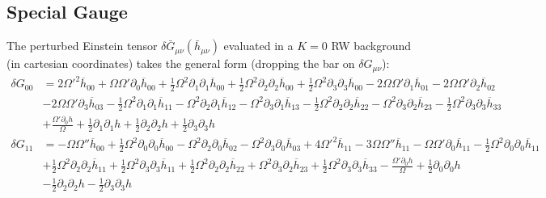 \documentclass[10pt,letterpaper]{article}
\numberwithin{equation}{section}
\begin{document}
\subsection{Special Gauge}
The perturbed Einstein tensor $\delta \bar G_{\mu\nu}(\bar h_{\mu\nu})$ evaluated in a $K=0$ RW background (in cartesian coordinates) takes the general form (dropping the bar on $\delta G_{\mu\nu}$):
\begin{align}
	\delta  G_{00} &=2 \Omega '^2 \overline{h}_{00} + \Omega \Omega ' \partial_{0} \overline{h}_{00} + \tfrac{1}{2} \Omega^2 \partial_{1} \partial_{1} \overline{h}_{00} + \tfrac{1}{2} \Omega^2 \partial_{2} \partial_{2} \overline{h}_{00} + \tfrac{1}{2} \Omega^2 \partial_{3} \partial_{3} \overline{h}_{00} - 2 \Omega \Omega ' \partial_{1} \overline{h}_{01} - 2 \Omega \Omega ' \partial_{2} \overline{h}_{02} \\
& - 2 \Omega \Omega ' \partial_{3} \overline{h}_{03} -  \tfrac{1}{2} \Omega^2 \partial_{1} \partial_{1} \overline{h}_{11} -  \Omega^2 \partial_{2} \partial_{1} \overline{h}_{12} -  \Omega^2 \partial_{3} \partial_{1} \overline{h}_{13} -  \tfrac{1}{2} \Omega^2 \partial_{2} \partial_{2} \overline{h}_{22} -  \Omega^2 \partial_{3} \partial_{2} \overline{h}_{23} -  \tfrac{1}{2} \Omega^2 \partial_{3} \partial_{3} \overline{h}_{33}\nonumber \\
&+ \frac{\Omega ' \partial_{0} h}{\Omega} + \tfrac{1}{2} \partial_{1} \partial_{1} h + \tfrac{1}{2} \partial_{2} \partial_{2} h + \tfrac{1}{2} \partial_{3} \partial_{3} h\nonumber
\end{align}
\begin{align}
	\delta  G_{11} &=- \Omega \Omega '' \overline{h}_{00} + \tfrac{1}{2} \Omega^2 \partial_{0} \partial_{0} \overline{h}_{00} -  \Omega^2 \partial_{2} \partial_{0} \overline{h}_{02} -  \Omega^2 \partial_{3} \partial_{0} \overline{h}_{03} + 4 \Omega '^2 \overline{h}_{11} - 3 \Omega \Omega '' \overline{h}_{11} -  \Omega \Omega ' \partial_{0} \overline{h}_{11} -  \tfrac{1}{2} \Omega^2 \partial_{0} \partial_{0} \overline{h}_{11}\\
&+ \tfrac{1}{2} \Omega^2 \partial_{2} \partial_{2} \overline{h}_{11} + \tfrac{1}{2} \Omega^2 \partial_{3} \partial_{3} \overline{h}_{11} + \tfrac{1}{2} \Omega^2 \partial_{2} \partial_{2} \overline{h}_{22} + \Omega^2 \partial_{3} \partial_{2} \overline{h}_{23} + \tfrac{1}{2} \Omega^2 \partial_{3} \partial_{3} \overline{h}_{33} -  \frac{\Omega ' \partial_{0} h}{\Omega} + \tfrac{1}{2} \partial_{0} \partial_{0} h \nonumber \\
&-  \tfrac{1}{2} \partial_{2} \partial_{2} h -  \tfrac{1}{2} \partial_{3} \partial_{3} h\nonumber
\end{align}
\end{document}
